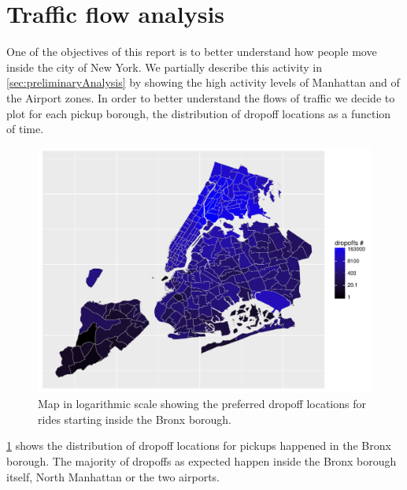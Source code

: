 \documentclass{acm_proc_article-sp-sigmod09}
\begin{document}
\section{Traffic flow analysis}

One of the objectives of this report is to better understand how people move inside the city of New York. We partially describe this activity in \cref{sec:preliminaryAnalysis} by showing the high activity levels of Manhattan and of the Airport zones. In order to better understand the flows of traffic we decide to plot for each pickup borough, the distribution of dropoff locations as a function of time.

\begin{figure}
	\centering
	\includegraphics[width=1\columnwidth]{resources/base_plots/bronx_dropoff_location_id_dist_map.pdf}
	\caption{Map in logarithmic scale showing the preferred dropoff locations for rides starting inside the Bronx borough.}
	\label{fig:bronxDropoffMap}
\end{figure}

\cref{fig:bronxDropoffMap} shows the distribution of dropoff locations for pickups happened in the Bronx borough. The majority of dropoffs as expected happen inside the Bronx borough itself, North Manhattan or the two airports.
\end{document}
